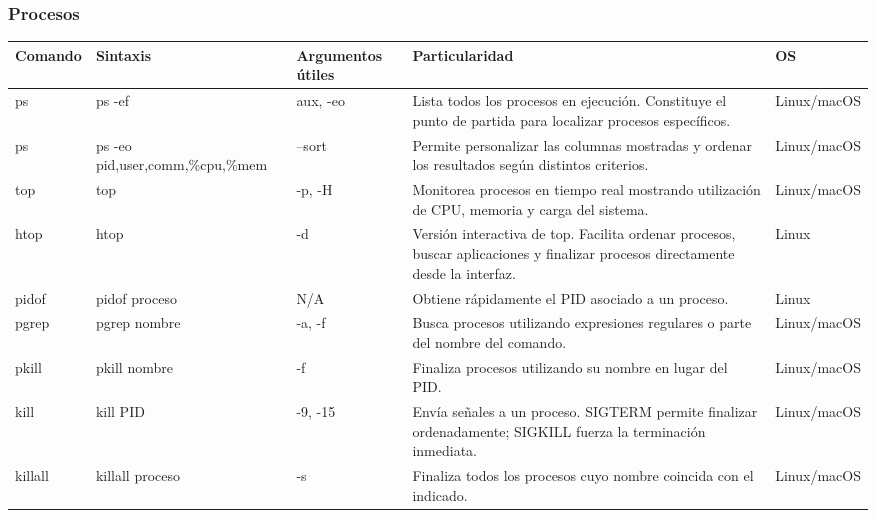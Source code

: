 \documentclass[a4paper,10pt]{article}
\begin{document}

\subsubsection{Procesos}

\begin{longtable}{|p{2.8cm}|p{3.2cm}|p{4cm}|p{5.4cm}|p{1.5cm}|}

\hline
Comando &
Sintaxis &
Argumentos útiles &
Particularidad &
OS
\\
\hline
\endhead

ps &
ps -ef &
aux, -eo &
Lista todos los procesos en ejecución. Constituye el punto de partida para localizar procesos específicos. &
Linux/macOS
\\
\hline

ps &
ps -eo pid,user,comm,\%cpu,\%mem &
--sort &
Permite personalizar las columnas mostradas y ordenar los resultados según distintos criterios. &
Linux/macOS
\\
\hline

top &
top &
-p, -H &
Monitorea procesos en tiempo real mostrando utilización de CPU, memoria y carga del sistema. &
Linux/macOS
\\
\hline

htop &
htop &
-d &
Versión interactiva de top. Facilita ordenar procesos, buscar aplicaciones y finalizar procesos directamente desde la interfaz. &
Linux
\\
\hline

pidof &
pidof proceso &
N/A &
Obtiene rápidamente el PID asociado a un proceso. &
Linux
\\
\hline

pgrep &
pgrep nombre &
-a, -f &
Busca procesos utilizando expresiones regulares o parte del nombre del comando. &
Linux/macOS
\\
\hline

pkill &
pkill nombre &
-f &
Finaliza procesos utilizando su nombre en lugar del PID. &
Linux/macOS
\\
\hline

kill &
kill PID &
-9, -15 &
Envía señales a un proceso. SIGTERM permite finalizar ordenadamente; SIGKILL fuerza la terminación inmediata. &
Linux/macOS
\\
\hline

killall &
killall proceso &
-s &
Finaliza todos los procesos cuyo nombre coincida con el indicado. &
Linux/macOS
\\
\hline


\end{longtable}
\end{document}
